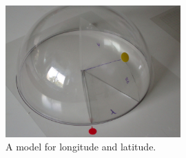 \documentclass[a4paper,12pt]{article}
\begin{document}
\begin{figure}[h]
\begin{center}
\includegraphics[width=0.6\textwidth]{../common/latlon.jpg}
\caption{A model for longitude and latitude.}
\end{center}
\end{figure}
\end{document}
